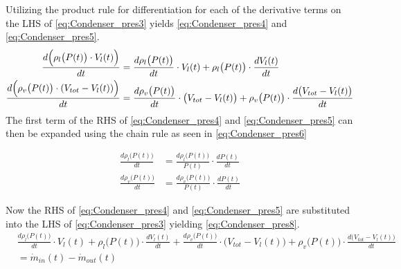 Utilizing the product rule for differentiation for each of the derivative terms on the LHS of \cref{eq:Condenser_pres3} yields \cref{eq:Condenser_pres4} and \cref{eq:Condenser_pres5}.
\begin{align}
	\frac{d \Bigl(\rho_{l}\bigl(P(t)\bigr)\cdot V_l(t)\Bigr)}{dt}  				& =   \frac{d \rho_{l}\bigl(P(t)\bigr)}{dt} \cdot V_l(t)   +   \rho_{l}\bigl(P(t)\bigr)\cdot\frac{d V_l(t)}{dt} 	\label{eq:Condenser_pres4} \\
	\frac{d \Bigl(\rho_{v}\bigl(P(t)\bigr)\cdot (V_{tot} - V_l(t))\Bigr) }{dt} 	& =  \frac{d \rho_{v}\bigl(P(t)\bigr)}{dt} \cdot \bigl(V_{tot} - V_l(t)\bigr)   +   \rho_{v}\bigl(P(t)\bigr)\cdot\frac{d \bigl(V_{tot} - V_l(t)\bigr)}{dt} 	\label{eq:Condenser_pres5}
\end{align}
The first term of the RHS of \cref{eq:Condenser_pres4} and \cref{eq:Condenser_pres5} can then be expanded using the chain rule as seen in \cref{eq:Condenser_pres6}

\begin{align}
	\frac{d \rho_{l}\bigl(P(t)\bigr)}{dt} 				& =   \frac{d \rho_{l}\bigl(P(t)\bigr)}{P(t)} \cdot \frac{dP(t)}{dt}	\label{eq:Condenser_pres6} \\
		\frac{d \rho_{v}\bigl(P(t)\bigr)}{dt} 			& =   \frac{d \rho_{v}\bigl(P(t)\bigr)}{P(t)} \cdot \frac{dP(t)}{dt}	\label{eq:Condenser_pres7}
\end{align}

Now the RHS of \cref{eq:Condenser_pres4} and \cref{eq:Condenser_pres5} are substituted into the LHS of \cref{eq:Condenser_pres3} yielding \cref{eq:Condenser_pres8}. \\


\begin{equation}\label{eq:Condenser_pres8}
	\begin{split}
		& \frac{d \rho_{l}\bigl(P(t)\bigr)}{dt} \cdot V_l(t)   +   \rho_{l}\bigl(P(t)\bigr)\cdot\frac{d V_l(t)}{dt} +
		\frac{d \rho_{v}\bigl(P(t)\bigr)}{dt} \cdot \bigl(V_{tot} - V_l(t)\bigr)   +   \rho_{v}\bigl(P(t)\bigr)\cdot\frac{d \bigl(V_{tot} - V_l(t)\bigr)}{dt} \\
		& = \dot{m}_{in}(t) - \dot{m}_{out}(t)
	\end{split}
\end{equation}


